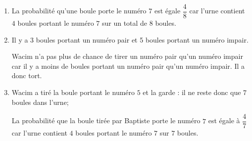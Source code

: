 
\medskip

\begin{enumerate}
\item La probabilité qu’une boule porte le numéro $7$ est égale $\dfrac{4}{8}$ car l’urne contient $4$ boules portant le numéro $7$ sur un total de 8 boules.
\item Il y a 3 boules portant un numéro pair et 5 boules portant un numéro impair.

Wacim n'a pas plus de chance de tirer un numéro pair qu'un numéro impair car il y a moins de boules portant un numéro pair qu'un numéro impair. Il a donc tort.
\item Wacim a tiré la boule portant le numéro $5$ et la garde : il ne reste donc que $7$ boules dans l’urne;

La probabilité que la boule tirée par Baptiste porte le numéro $7$ est égale à $\dfrac{4}{7}$ car l’urne contient $4$ boules portant le numéro $7$ sur $7$ boules.
\end{enumerate}

\vspace{0.5cm}

